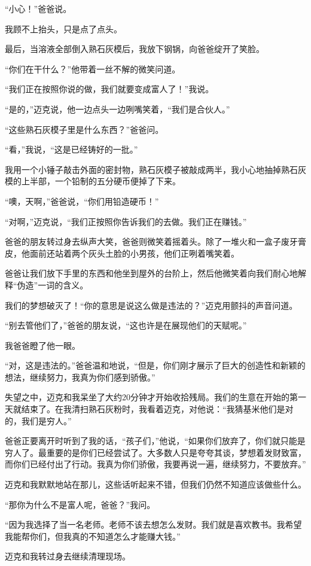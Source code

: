 “小心！”爸爸说。

我顾不上抬头，只是点了点头。

最后，当溶液全部倒入熟石灰模后，我放下钢锅，向爸爸绽开了笑脸。

“你们在干什么？”他带着一丝不解的微笑问道。

“我们正在按照你说的做，我们就要变成富人了！”我说。

“是的，”迈克说，他一边点头一边咧嘴笑着，“我们是合伙人。”

“这些熟石灰模子里是什么东西？”爸爸问。

“看，”我说，“这是已经铸好的一批。”

我用一个小锤子敲击外面的密封物，熟石灰模子被敲成两半，我小心地抽掉熟石灰模的上半部，一个铅制的五分硬币便掉了下来。

“噢，天啊，”爸爸说，“你们用铅造硬币！”

“对啊，”迈克说，“我们正按照你告诉我们的去做。我们正在赚钱。”

爸爸的朋友转过身去纵声大笑，爸爸则微笑着摇着头。除了一堆火和一盒子废牙膏皮，他面前还站着两个灰头土脸的小男孩，他们正咧着嘴笑着。

爸爸让我们放下手里的东西和他坐到屋外的台阶上，然后他微笑着向我们耐心地解释“伪造”一词的含义。

我们的梦想破灭了！“你的意思是说这么做是违法的？”迈克用颤抖的声音问道。

“别去管他们了，”爸爸的朋友说，“这也许是在展现他们的天赋呢。”

我爸爸瞪了他一眼。

“对，这是违法的。”爸爸温和地说，“但是，你们刚才展示了巨大的创造性和新颖的想法，继续努力，我真为你们感到骄傲。”

失望之中，迈克和我呆坐了大约20分钟才开始收拾残局。我们的生意在开始的第一天就结束了。在我清扫熟石灰粉时，我看着迈克，对他说：“我猜基米他们是对的，我们是穷人。”

爸爸正要离开时听到了我的话，“孩子们，”他说，“如果你们放弃了，你们就只能是穷人了。最重要的是你们已经尝试了。大多数人只是夸夸其谈，梦想着发财致富，而你们已经付出了行动。我真为你们骄傲，我要再说一遍，继续努力，不要放弃。”

迈克和我默默地站在那儿，这些话听起来不错，但我们仍然不知道应该做些什么。

“那你为什么不是富人呢，爸爸？”我问。

“因为我选择了当一名老师。老师不该去想怎么发财。我们就是喜欢教书。我希望我能帮你们，但我真的不知道怎么才能赚大钱。”

迈克和我转过身去继续清理现场。

